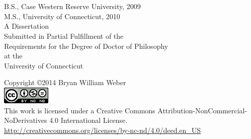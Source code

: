 \documentclass[12pt,letterpaper,oneside,draft]{book}
\begin{document}
\newpage

\thispagestyle{empty}
\begin{center}
\blankline \blankline
\thetitle \\
\blankline
\theauthor \\
\blankline \blankline
B.S., Case Western Reserve University, 2009 \\
M.S., University of Connecticut, 2010 \\
\blankline \blankline \blankline \blankline \blankline \blankline
\blankline \blankline
A Dissertation \\
Submitted in Partial Fulfillment of the \\
Requirements for the Degree of Doctor of Philosophy \\
at the \\
University of Connecticut \\
\blankline {}
\end{center}
\newpage

\thispagestyle{empty}
\begin{center}
Copyright \copyright 2014 Bryan William Weber \\
\includegraphics{images/CC-license.png} \\
\blankline
This work is licensed under a Creative Commons Attribution-NonCommercial-NoDerivatives 4.0 International License. \\
\url{http://creativecommons.org/licenses/by-nc-nd/4.0/deed.en_US} \\
\blankline \blankline \blankline \blankline \blankline \blankline
\blankline \blankline \blankline \blankline \blankline \blankline
\blankline \blankline \blankline \blankline \blankline \blankline
\blankline {}
\end{center}
\newpage
\end{document}
